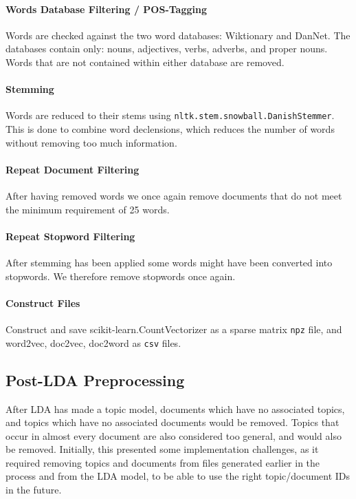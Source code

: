 \paragraph{Words Database Filtering / POS-Tagging}
Words are checked against the two word databases: Wiktionary and DanNet. 
The databases contain only: nouns, adjectives, verbs, adverbs, and proper nouns. 
Words that are not contained within either database are removed.

\paragraph{Stemming}
Words are reduced to their stems using \texttt{nltk.stem.snowball.DanishStemmer}. 
This is done to combine word declensions, which reduces the number of words without removing too much information.

\paragraph{Repeat Document Filtering}
After having removed words we once again remove documents that do not meet the minimum requirement of 25 words.

\paragraph{Repeat Stopword Filtering}
After stemming has been applied some words might have been converted into stopwords.
We therefore remove stopwords once again.


\paragraph{Construct Files}
Construct and save scikit-learn.CountVectorizer as a sparse matrix \texttt{npz} file, and word2vec, doc2vec, doc2word as \texttt{csv} files.

\subsection{Post-LDA Preprocessing}
After LDA has made a topic model, documents which have no associated topics, and topics which have no associated documents would be removed.
Topics that occur in almost every document are also considered too general, and would also be removed. 
Initially, this presented some implementation challenges, as it required removing topics and documents from files generated earlier in the process and from the LDA model, to be able to use the right topic/document IDs in the future.


